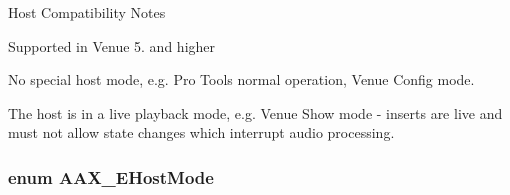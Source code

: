 \begin{DoxyRefDesc}{Host Compatibility Notes}
\item[\hyperlink{a00380__compatibility_notes000025}{Host Compatibility Notes}]Supported in Venue 5. and higher \end{DoxyRefDesc}
\begin{Desc}
\item[Enumerator]\par
\begin{description}
\item[{\em 
\hypertarget{a00206_aa3c8056a6ce601cc3367cb7d4478e9daaa72ba643264dbc37d627b91534db7c1a}{}A\+A\+X\+\_\+e\+Host\+Mode\+Bits\+\_\+\+None\label{a00206_aa3c8056a6ce601cc3367cb7d4478e9daaa72ba643264dbc37d627b91534db7c1a}
}]No special host mode, e.\+g. Pro Tools normal operation, Venue Config mode. \item[{\em 
\hypertarget{a00206_aa3c8056a6ce601cc3367cb7d4478e9daa83555a8ed532fa43f3583af95ca3d39b}{}A\+A\+X\+\_\+e\+Host\+Mode\+Bits\+\_\+\+Live\label{a00206_aa3c8056a6ce601cc3367cb7d4478e9daa83555a8ed532fa43f3583af95ca3d39b}
}]The host is in a live playback mode, e.\+g. Venue Show mode -\/ inserts are live and must not allow state changes which interrupt audio processing. \end{description}
\end{Desc}
\hypertarget{a00206_af7d77416967955e258539694870f395a}{}
\subsubsection[{A\+A\+X\+\_\+\+E\+Host\+Mode}]{\setlength{\rightskip}{0pt plus 5cm}enum {\bf A\+A\+X\+\_\+\+E\+Host\+Mode}}\label{a00206_af7d77416967955e258539694870f395a}


